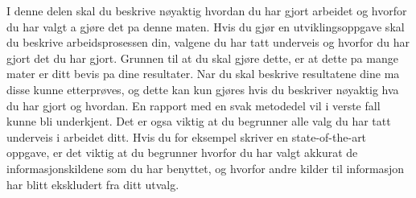 I denne delen skal du beskrive nøyaktig hvordan du har gjort arbeidet og hvorfor du har valgt a gjøre det pa denne maten. Hvis du gjør en utviklingsoppgave skal du beskrive arbeidsprosessen din, valgene du har tatt underveis og hvorfor du har gjort det du har gjort. Grunnen til at du skal gjøre dette, er at dette pa mange mater er ditt bevis pa dine resultater. Nar du skal beskrive resultatene dine ma disse kunne etterprøves, og dette kan kun gjøres hvis du beskriver nøyaktig hva du har gjort og hvordan. En rapport med en svak metodedel vil i verste fall kunne bli underkjent. Det er ogsa viktig at du begrunner alle valg du har tatt underveis i arbeidet ditt. Hvis du for eksempel skriver en state-of-the-art oppgave, er det viktig at du begrunner hvorfor du har valgt akkurat de informasjonskildene som du har benyttet, og hvorfor andre kilder til informasjon har blitt ekskludert fra ditt utvalg.